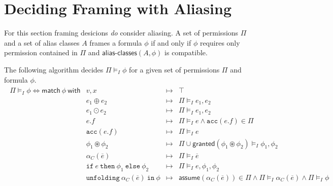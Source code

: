 \documentclass{article}
\newcommand{\tsf}{\textsf}
\newcommand{\tit}{\textit}
\newcommand{\ttt}{\texttt}
\newcommand{\assume}{\tsf{assume}}
\newcommand{\frames}{\vDash_I}
\newcommand{\mt}{\mapsto}
\newcommand{\cast}{\circledast}
\renewcommand{\vec}{\overline}
\newcommand{\cif}{\ttt{if}}
\newcommand{\cthen}{\ttt{then}}
\newcommand{\celse}{\ttt{else}}
\newcommand{\cacc}{\ttt{acc}}
\newcommand{\cunfolding}{\ttt{unfolding}}
\newcommand{\cin}{\ttt{in}}
\newcommand{\granted}{\tsf{granted}}
\begin{document}
\newpage
\section{Deciding Framing with Aliasing}

For this section framing desicions \tit{do} consider aliasing.
A set of permissions $\Pi$ and a set of alias classes $A$ frames a formula $\phi$ if and only if $\phi$ requires only permission contained in $\Pi$ and $\tsf{alias-classes}(A, \phi)$ is compatible.

\noindent

The following algorithm decides $\Pi \frames \phi$ for a given set of permissions $\Pi$ and formula $\phi$.
\begin{align*}
\begin{array}{r|lrl}
\Pi \frames \phi
\iff \tsf{match} \ \phi \ \tsf{with}
%
%
& v, x                &\mt& \top
\\
& e_1 \oplus e_2      &\mt& \Pi \frames e_1, e_2
\\
& e_1 \odot e_2       &\mt& \Pi \frames e_1, e_2
\\
& e.f                 &\mt& \Pi \frames e
                      \land \cacc(e.f) \in \Pi
\\
%
& \cacc(e.f)          &\mt& \Pi \frames e
\\
& \phi_1 \cast \phi_2 &\mt& \Pi \cup \tsf{granted}(\phi_1 \cast \phi_2) \frames \phi_1, \phi_2
\\
& \alpha_C(\vec{e})   &\mt& \Pi \frames \vec{e}
\\
& \cif \ e \ \cthen \ \phi_1 \ \celse \ \phi_2
                      &\mt& \Pi \frames e, \phi_1, \phi_2
\\
& \cunfolding \ \alpha_C(\vec{e}) \ \cin \ \phi
                      &\mt& \assume(\alpha_C(\vec{e})) \in \Pi
                      \land \Pi \frames \alpha_C(\vec{e})
                      \land \Pi \frames \phi
\end{array}
\end{align*}
\end{document}
